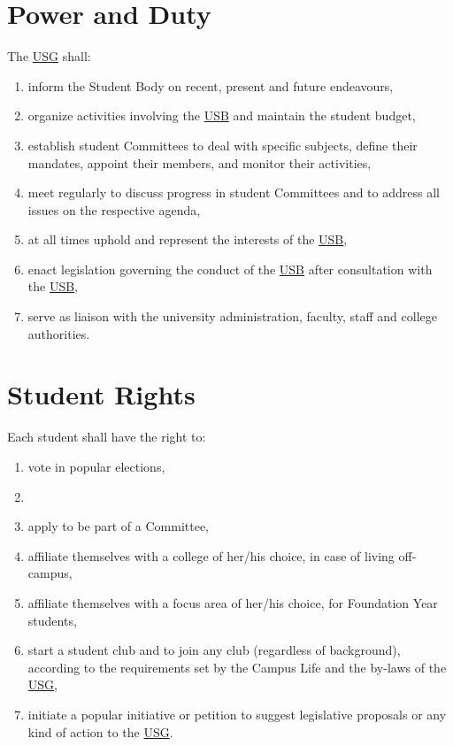 \section{Power and Duty}
The \hyperref[USGdef]{USG} shall: 
\begin{enumerate}
\item inform the Student Body on recent, present and future endeavours,
\item organize activities involving the \hyperref[studentbody]{USB} and maintain the student budget,
\item establish student Committees to deal with specific subjects, define their mandates, appoint their members, and monitor their activities,
\item meet regularly to discuss progress in student Committees and to address all issues on the respective agenda,
\item at all times uphold and represent the interests of the \hyperref[studentbody]{USB},
\item enact legislation governing the conduct of the \hyperref[studentbody]{USB} after consultation with the \hyperref[studentbody]{USB},
\item serve as liaison with the university administration, faculty, staff and college authorities.
\end{enumerate}

\section{Student Rights}
Each student shall have the right to:
\begin{enumerate}[nosep] 
\item
vote in popular elections,

\item
{}

\item
apply to be part of a Committee,

\item
affiliate themselves with a college of her/his choice, in case of living off-campus,

\item 
affiliate themselves with a focus area of her/his choice, for Foundation Year students,

\item
start a student club and to join any club (regardless of background), according to the requirements set by the Campus Life and the by-laws of the \hyperref[USGdef]{USG},

\item
initiate a popular initiative or petition to suggest legislative proposals or any kind of action to the \hyperref[USGdef]{USG}.
\end{enumerate}

